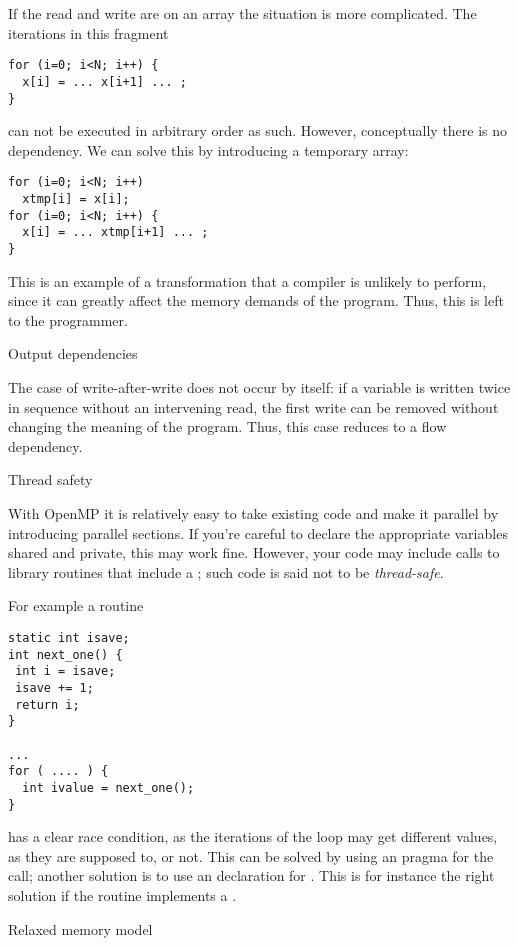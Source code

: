 If the read and write are on an array the situation is more complicated.
The iterations in this fragment
\begin{verbatim}
for (i=0; i<N; i++) {
  x[i] = ... x[i+1] ... ;
}
\end{verbatim}
can not be executed in arbitrary order as such. However, conceptually there
is no dependency. We can solve this by introducing a temporary array:
\begin{verbatim}
for (i=0; i<N; i++)
  xtmp[i] = x[i];
for (i=0; i<N; i++) {
  x[i] = ... xtmp[i+1] ... ;
}
\end{verbatim}
This is an example of a transformation that a compiler is unlikely
to perform, since it can greatly affect the memory demands of the program.
Thus, this is left to the programmer.

 {Output dependencies}

The case of write-after-write does not occur by itself:
if a variable is written twice in sequence without an intervening
read, the first write can be removed without changing the meaning of the program.
Thus, this case reduces to a flow dependency.


 {Thread safety}

With OpenMP it is relatively easy to take existing code and make
it parallel by introducing parallel sections. If you're careful
to declare the appropriate variables shared and private,
this may work fine. However, your code may include
calls to library routines that include a ;
such code is said not to be \emph{thread-safe}.

For example a routine
\begin{verbatim}
static int isave;
int next_one() {
 int i = isave;
 isave += 1;
 return i;
}

...
for ( .... ) {
  int ivalue = next_one();
}
\end{verbatim}
has a clear race condition, as the iterations of the loop
may get different  values, as they are supposed to,
or not. This can be solved by using an 
pragma for the  call; another solution 
is to use an  declaration for .
This is for instance the right solution if  the 
routine implements a .


 {Relaxed memory model}

